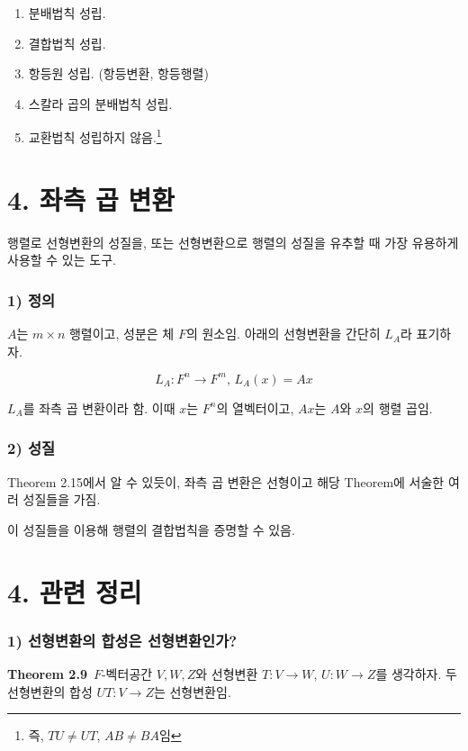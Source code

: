 \documentclass[10pt, a4paper]{article}
\begin{document}
\begin{enumerate}
    \item 분배법칙 성립.
    \item 결합법칙 성립.
    \item 항등원 성립. (항등변환, 항등행렬)
    \item 스칼라 곱의 분배법칙 성립.
    \item 교환법칙 성립하지 않음.\footnote{즉, $TU \neq UT$, $AB \neq BA$임}\\
\end{enumerate}


\section*{4. 좌측 곱 변환}

행렬로 선형변환의 성질을, 또는 선형변환으로 행렬의 성질을 유추할 때 가장 유용하게 사용할 수 있는 도구.

\subsubsection*{1) 정의}
$A$는 $m \times n$ 행렬이고, 성분은 체 $F$의 원소임. 아래의 선형변환을 간단히 $L_A$라 표기하자.

\[
L_A:F^n \rightarrow F^m,\, L_A(x)=Ax
\]

$L_A$를 좌측 곱 변환이라 함. 이때 $x$는 $F^n$의 열벡터이고, $Ax$는 $A$와 $x$의 행렬 곱임.

\subsubsection*{2) 성질}
Theorem 2.15에서 알 수 있듯이, 좌측 곱 변환은 선형이고 해당 Theorem에 서술한 여러 성질들을 가짐.

이 성질들을 이용해 행렬의 결합법칙을 증명할 수 있음.


\newpage


\section*{4. 관련 정리}

\subsubsection*{1) 선형변환의 합성은 선형변환인가?}
\textbf{Theorem 2.9}\, $F$-벡터공간 $V,W,Z$와 선형변환 $T:V \rightarrow W$, $U:W \rightarrow Z$를 생각하자. 두 선형변환의 합성 $UT:V \rightarrow Z$는 선형변환임.
\end{document}
